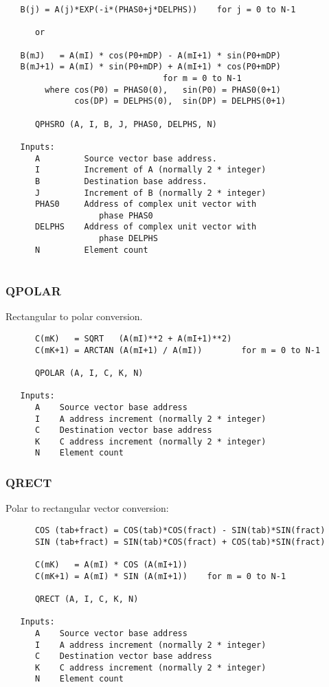 \begin{verbatim}
   B(j) = A(j)*EXP(-i*(PHAS0+j*DELPHS))    for j = 0 to N-1

      or

   B(mJ)   = A(mI) * cos(P0+mDP) - A(mI+1) * sin(P0+mDP)
   B(mJ+1) = A(mI) * sin(P0+mDP) + A(mI+1) * cos(P0+mDP)
                                for m = 0 to N-1
        where cos(P0) = PHAS0(0),   sin(P0) = PHAS0(0+1)
              cos(DP) = DELPHS(0),  sin(DP) = DELPHS(0+1)

      QPHSRO (A, I, B, J, PHAS0, DELPHS, N)

   Inputs:
      A         Source vector base address.
      I         Increment of A (normally 2 * integer)
      B         Destination base address.
      J         Increment of B (normally 2 * integer)
      PHAS0     Address of complex unit vector with
                   phase PHAS0
      DELPHS    Address of complex unit vector with
                   phase DELPHS
      N         Element count
 

\end{verbatim}
\subsubsection{QPOLAR }
Rectangular to polar conversion.

\begin{verbatim}
      C(mK)   = SQRT   (A(mI)**2 + A(mI+1)**2)
      C(mK+1) = ARCTAN (A(mI+1) / A(mI))        for m = 0 to N-1

      QPOLAR (A, I, C, K, N)

   Inputs:
      A    Source vector base address
      I    A address increment (normally 2 * integer)
      C    Destination vector base address
      K    C address increment (normally 2 * integer)
      N    Element count

\end{verbatim}
\subsubsection{QRECT }
Polar to rectangular vector conversion:

\begin{verbatim}
      COS (tab+fract) = COS(tab)*COS(fract) - SIN(tab)*SIN(fract)
      SIN (tab+fract) = SIN(tab)*COS(fract) + COS(tab)*SIN(fract)

      C(mK)   = A(mI) * COS (A(mI+1))
      C(mK+1) = A(mI) * SIN (A(mI+1))    for m = 0 to N-1

      QRECT (A, I, C, K, N)

   Inputs:
      A    Source vector base address
      I    A address increment (normally 2 * integer)
      C    Destination vector base address
      K    C address increment (normally 2 * integer)
      N    Element count

\end{verbatim}
